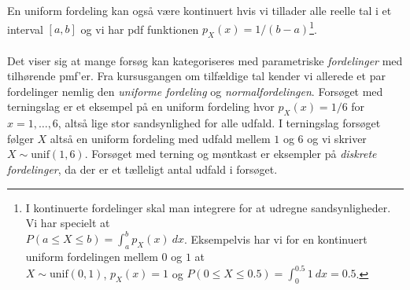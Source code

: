 
 En uniform fordeling kan også være kontinuert hvis vi tillader alle reelle tal i et interval $[a,b]$ og vi har pdf funktionen $p_X(x) = 1/(b-a)$\footnote{I kontinuerte fordelinger skal man integrere for at udregne sandsynligheder. Vi har specielt at \\
 $P(a \leq X \leq b) = \int_a^b p_X(x)\ dx$. Eksempelvis har vi for en kontinuert uniform fordelingen mellem $0$ og $1$ at\\ $X \sim \text{unif}(0,1)$, $p_X(x) = 1$ og $P(0 \leq X \leq 0.5) = \int_0^{0.5} 1 \ dx = 0.5$.}.
\\ \\ 



Det viser sig at mange forsøg kan kategoriseres med parametriske \textit{fordelinger} med tilhørende pmf'er. Fra kursusgangen om tilfældige tal kender vi allerede et par fordelinger nemlig den \textit{uniforme fordeling}  og \textit{normalfordelingen}. Forsøget med terningslag er et eksempel på en uniform fordeling hvor $p_X(x) = 1/6$ for $x = 1,\dots, 6$, altså lige stor sandsynlighed for alle udfald. I terningslag forsøget følger $X$ altså en uniform fordeling med udfald mellem $1$ og $6$ og vi skriver $X \sim \text{unif}(1,6)$. Forsøget med terning og møntkast er eksempler på \textit{diskrete fordelinger}, da der er et tælleligt antal udfald i forsøget.